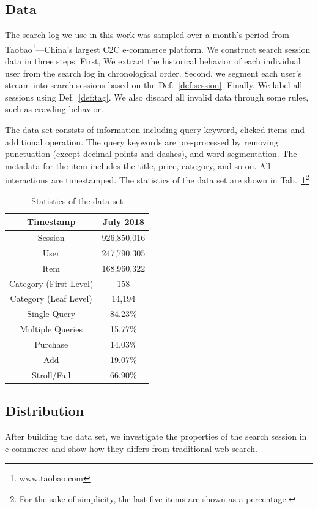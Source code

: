 \documentclass[sigconf,anonymous]{acmart}
\theoremstyle{definition}
\begin{document}
\subsection{Data}\label{sec:definition:data}
The search log we use in this work was sampled over a month's period from Taobao\footnote{www.taobao.com}---China's largest C2C e-commerce platform. We construct search session data in three steps. First, We extract the historical behavior of each individual user from the search log in chronological order. Second, we segment each user's stream into search sessions based on the Def.~\ref{def:session}. Finally, We label all sessions using Def.~\ref{def:tag}. We also discard all invalid data through some rules, such as crawling behavior.

The data set consists of information including query keyword, clicked items and additional operation. The query keywords are pre-processed by removing punctuation (except decimal points and dashes), and word segmentation. The metadata for the item includes the title, price, category, and so on. All interactions are timestamped. The statistics of the data set are shown in Tab.~\ref{tab:statistics1}\footnote{For the sake of simplicity, the last five items are shown as a percentage.}
\begin{table}[htbp]
\centering
\small
\caption{Statistics of the data set}\label{tab:statistics1}
\vspace*{-5pt}
\begin{tabular}{|c|c|}
\hline
Timestamp & July 2018\\\hline
Session & 926,850,016 \\\hline
User & 247,790,305 \\\hline
Item & 168,960,322 \\\hline
Category (First Level) & 158 \\\hline
Category (Leaf Level) & 14,194 \\\hline
Single Query & 84.23\%\\\hline
Multiple Queries & 15.77\%\\\hline
Purchase & 14.03\%\\\hline
Add & 19.07\%\\\hline
Stroll/Fail & 66.90\%\\\hline
\end{tabular}
\end{table}

\subsection{Distribution}\label{sec:definition:dist}
After building the data set, we investigate the properties of the search session in e-commerce and show how they differs from traditional web search. 
\end{document}
